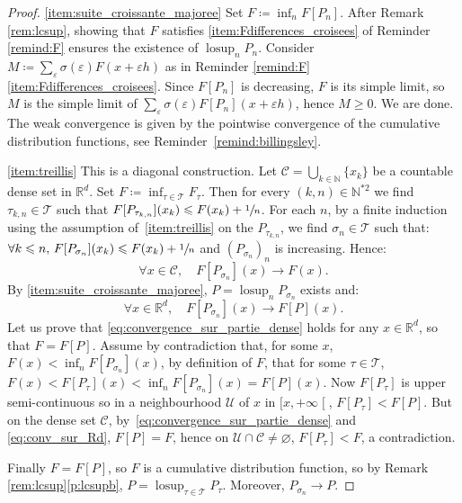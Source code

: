 \documentclass[JEP,XML,SOM,Unicode,NoEqCountersInSection,NoFloatCountersInSection,published]{cedram}
\theoremstyle{plain}
\theoremstyle{definition}
\newcommand{\Tt}{{\mathcal T}}
\newcommand{\eqdef}{\coloneqq}
\let\eps\varepsilon
\newcommand{\R}{\mathbb{R}}
\newcommand{\N}{\mathbb{N}}
\newcommand{\lcsup}{\operatorname{losup}}
\newcommand{\clo}{\mathclose}
\begin{document}
\skpt
\begin{proof}
\eqref{item:suite_croissante_majoree}
Set $F\eqdef\inf_nF[P_n]$. After Remark \ref{rem:lcsup}, showing that $F$ satisfies \eqref{item:Fdifferences_croisees} of Reminder \ref{remind:F} ensures the existence of $\lcsup_nP_n$. Consider $M\eqdef\sum_{\eps} \sigma(\eps) F(x+\eps h)$ as in Reminder \ref{remind:F}\eqref{item:Fdifferences_croisees}. Since $F[P_n]$ is decreasing, $F$ is its simple limit, so $M$ is the simple limit of $\sum_{\eps} \sigma(\eps) F[P_n](x+\eps h)$, hence $M\geqslant0$. We are done. The weak convergence is given by the pointwise convergence of the cumulative distribution functions, see Reminder~\ref{remind:billingsley}.

\eqref{item:treillis}
This is a diagonal construction. Let $\mathcal{C}=\bigcup_{k\in\N}\{x_k\}$ be a countable dense set in $\R^d$. Set $F\eqdef\inf_{\tau\in\Tt}F_\tau$. Then for every $(k,n)\in\N^{\ast2}$ we find $\tau_{k,n}\in \Tt$ such that $F[P_{\tau_{k,n}}](x_k)\leqslant F(x_k)+\sfrac1n$. For each $n$, by a finite induction using the assumption of~\eqref{item:treillis} on the $P_{\tau_{k,n}}$, we find $\sigma_{n}\in \Tt$ such that: $\forall k\leqslant n,\, F[P_{\sigma_{n}}](x_k)\leqslant F(x_k)+\sfrac1n$ and $(P_{\sigma_n})_n$ is increasing. Hence:
\begin{equation}\label{eq:convergence_sur_partie_dense}
\forall x\in \mathcal{C},\quad F[P_{\sigma_{n}}](x)\to F(x).
\end{equation}
By \eqref{item:suite_croissante_majoree}, $P=\lcsup_n P_{\sigma_n}$ exists and:
\begin{equation}\label{eq:conv_sur_Rd}
\forall x\in \R^d,\quad F[P_{\sigma_{n}}](x)\to F[P](x).
\end{equation}
Let us prove that \eqref{eq:convergence_sur_partie_dense} holds for any $x\in\R^d$, so that $F=F[P]$. Assume by contradiction that, for some $x$, $F(x)<\inf_nF[P_{\sigma_n}](x)$, \ie by definition of $F$, that for some $\tau\in\Tt$, $F(x)<F[P_\tau](x)<\inf_nF[P_{\sigma_n}](x)=F[P](x)$. Now $F[P_\tau]$ is upper semi-continuous so in a neighbourhood $\mathcal{U}$ of $x$ in $[x,+\infty\clo[$, $F[P_\tau]<F[P]$. But on the dense set $\mathcal{C}$, by~\eqref{eq:convergence_sur_partie_dense} and \eqref{eq:conv_sur_Rd}, $F[P]=F$, hence on $\mathcal{U}\cap\mathcal{C}\neq\varnothing$, $F[P_\tau]<F$, a contradiction.

Finally $F=F[P]$, so $F$ is a cumulative distribution function, so by Remark \ref{rem:lcsup}\eqref{p:lcsupb}, $P=\lcsup_{\tau\in\Tt}P_{\tau}$. Moreover, $P_{\sigma_n}\to P$.
\end{proof}
\end{document}
